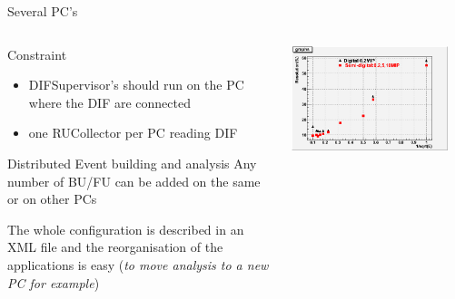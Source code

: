 \documentclass[10pt]{beamer}
\begin{document}
\begin{frame}{Several PC's}

\begin{columns}
 \begin{column}{0.5\textwidth}

\begin{block}{Constraint}
  \begin{itemize}
    \item DIFSupervisor's should run on the PC where the DIF are connected 
    \item one RUCollector per PC reading DIF
  \end{itemize}
\end{block}
\pause
\begin{block}{Distributed Event building and analysis}
Any number of BU/FU can be added on the same or on other PCs

The whole configuration is described in an XML file and the reorganisation of the applications is easy ({\sl to move analysis to a new PC for example})
\end{block}
\end{column}
 \begin{column}{0.5\textwidth}
   \centerline{\includegraphics[width=0.9\textwidth]{images/DigitalSemiDigital}}
\end{column}
\end{columns}


\end{frame}
\end{document}
